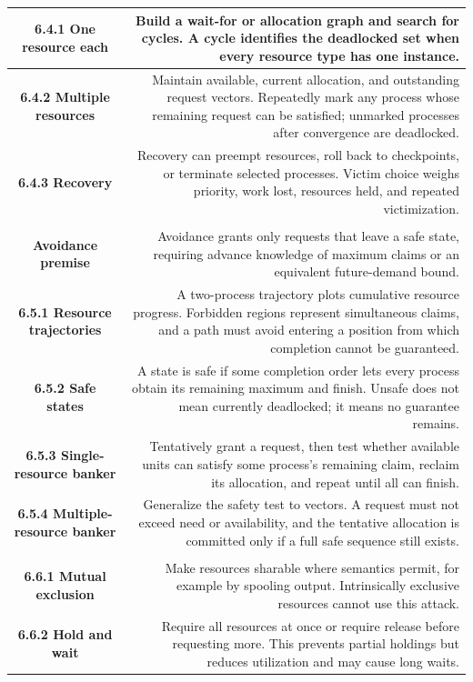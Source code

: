 \documentclass[10pt,letterpaper]{article}
\begin{document}
\begin{longtable}{C N}
\textbf{6.4.1 One resource each} & Build a wait-for or allocation graph and search for cycles. A cycle identifies the deadlocked set when every resource type has one instance.\\\hline
\textbf{6.4.2 Multiple resources} & Maintain available, current allocation, and outstanding request vectors. Repeatedly mark any process whose remaining request can be satisfied; unmarked processes after convergence are deadlocked.\\\hline
\textbf{6.4.3 Recovery} & Recovery can preempt resources, roll back to checkpoints, or terminate selected processes. Victim choice weighs priority, work lost, resources held, and repeated victimization.\\\hline
{}\\*\hline
\textbf{Avoidance premise} & Avoidance grants only requests that leave a safe state, requiring advance knowledge of maximum claims or an equivalent future-demand bound.\\\hline
\textbf{6.5.1 Resource trajectories} & A two-process trajectory plots cumulative resource progress. Forbidden regions represent simultaneous claims, and a path must avoid entering a position from which completion cannot be guaranteed.\\\hline
\textbf{6.5.2 Safe states} & A state is safe if some completion order lets every process obtain its remaining maximum and finish. Unsafe does not mean currently deadlocked; it means no guarantee remains.\\\hline
\textbf{6.5.3 Single-resource banker} & Tentatively grant a request, then test whether available units can satisfy some process's remaining claim, reclaim its allocation, and repeat until all can finish.\\\hline
\textbf{6.5.4 Multiple-resource banker} & Generalize the safety test to vectors. A request must not exceed need or availability, and the tentative allocation is committed only if a full safe sequence still exists.\\\hline
{}\\*\hline
\textbf{6.6.1 Mutual exclusion} & Make resources sharable where semantics permit, for example by spooling output. Intrinsically exclusive resources cannot use this attack.\\\hline
\textbf{6.6.2 Hold and wait} & Require all resources at once or require release before requesting more. This prevents partial holdings but reduces utilization and may cause long waits.\\\hline

\end{longtable}
\end{document}
